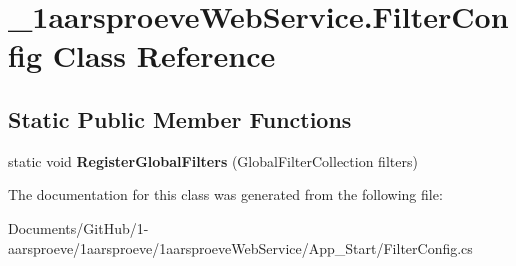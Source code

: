 \hypertarget{class__1aarsproeve_web_service_1_1_filter_config}{}\section{\+\_\+1aarsproeve\+Web\+Service.\+Filter\+Config Class Reference}
\label{class__1aarsproeve_web_service_1_1_filter_config}
\subsection*{Static Public Member Functions}
\begin{DoxyCompactItemize}
\item 
\hypertarget{class__1aarsproeve_web_service_1_1_filter_config_aa408c602cd6d9244e1299d9c2ab9566e}{}static void {\bfseries Register\+Global\+Filters} (Global\+Filter\+Collection filters)\label{class__1aarsproeve_web_service_1_1_filter_config_aa408c602cd6d9244e1299d9c2ab9566e}

\end{DoxyCompactItemize}


The documentation for this class was generated from the following file\+:\begin{DoxyCompactItemize}
\item 
Documents/\+Git\+Hub/1-\/aarsproeve/1aarsproeve/1aarsproeve\+Web\+Service/\+App\+\_\+\+Start/Filter\+Config.\+cs\end{DoxyCompactItemize}
